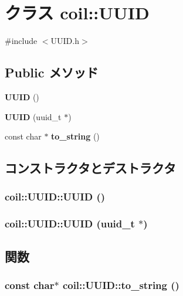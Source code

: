 \section{クラス coil::UUID}
\label{classcoil_1_1UUID}


{\ttfamily \#include $<$UUID.h$>$}

\subsection*{Public メソッド}
\begin{DoxyCompactItemize}
\item 
{\bf UUID} ()
\item 
{\bf UUID} (uuid\_\-t $\ast$)
\item 
const char $\ast$ {\bf to\_\-string} ()
\end{DoxyCompactItemize}


\subsection{コンストラクタとデストラクタ}
\subsubsection[{UUID}]{\setlength{\rightskip}{0pt plus 5cm}coil::UUID::UUID ()}\label{classcoil_1_1UUID_a625ff4bcb035907ffc4709dbbb8dbb44}
\subsubsection[{UUID}]{\setlength{\rightskip}{0pt plus 5cm}coil::UUID::UUID (uuid\_\-t $\ast$)}\label{classcoil_1_1UUID_a67b865a76894a9a93139de516ac19416}


\subsection{関数}
\subsubsection[{to\_\-string}]{\setlength{\rightskip}{0pt plus 5cm}const char$\ast$ coil::UUID::to\_\-string ()}\label{classcoil_1_1UUID_afd2e095e3ee36081c7b37c89fbe433f6}
